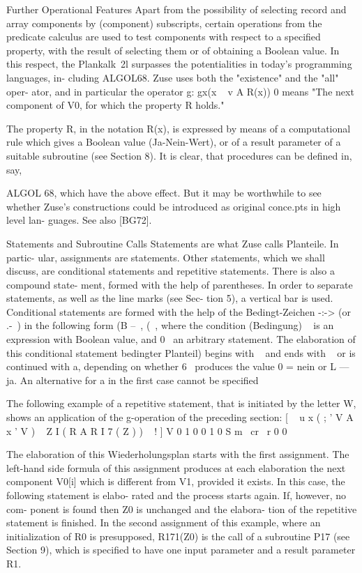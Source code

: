 Further Operational Features
Apart from the possibility of selecting record and
array components by (component) subscripts, certain
operations from the predicate calculus are used to test
components with respect to a specified property, with
the result of selecting them or of obtaining a Boolean
value. In this respect, the Plankalk~2l surpasses the
potentialities in today's programming languages, in-
cluding ALGOL68.
Zuse uses both the "existence" and the "all" oper-
ator, and in particular the operator g:
gx(x ~ v A R(x))
0
means "The next component of V0, for which the
property R holds."


The property R, in the notation R(x), is expressed
by means of a computational rule which gives a Boolean
value (Ja-Nein-Wert), or of a result parameter of a
suitable subroutine (see Section 8).
It is clear, that procedures can be defined in, say,

ALGOL 68, which have the above effect. But it may be
worthwhile to see whether Zuse's constructions could
be introduced as original conce.pts in high level lan-
guages. See also [BG72].


Statements and Subroutine Calls
Statements are what Zuse calls Planteile. In partic-
ular, assignments are statements. Other statements,
which we shall discuss, are conditional statements and
repetitive statements. There is also a compound state-
ment, formed with the help of parentheses. In order to
separate statements, as well as the line marks (see Sec-
tion 5), a vertical bar is used.
Conditional statements are formed with the help of
the Bedingt-Zeichen -:-> (or .-~) in the following form
(B --~, (~,
where the condition (Bedingung) ~ is an expression with
Boolean value, and 0~ an arbitrary statement. The
elaboration of this conditional statement bedingter
Planteil) begins with ~ and ends with ~ or is continued
with a, depending on whether 6~ produces the value
0 = nein or L --- ja. An alternative for a in the first
case cannot be specified

The following example of a repetitive statement, that
is initiated by the letter W, shows an application of the
g-operation of the preceding section:
[ ~ u x ( ; ' V A x ' V ) ~ Z I ( R A R I 7 ( Z ) ) ~ ! ]
V 0 1 0 0 1 0
S m~ cr ~r 0 0

The elaboration of this Wiederholungsplan starts
with the first assignment. The left-hand side formula of
this assignment produces at each elaboration the next
component V0[i] which is different from V1, provided
it exists. In this case, the following statement is elabo-
rated and the process starts again. If, however, no com-
ponent is found then Z0 is unchanged and the elabora-
tion of the repetitive statement is finished.
In the second assignment of this example, where an
initialization of R0 is presupposed, R171(Z0) is the call
of a subroutine P17 (see Section 9), which is specified
to have one input parameter and a result parameter R1.


